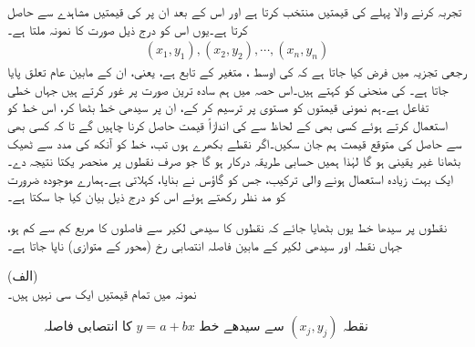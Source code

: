 تجربہ کرنے والا پہلے  کی  قیمتیں  منتخب کرتا ہے اور اس کے بعد ان  پر  کی قیمتیں مشاہدے سے حاصل کرتا ہے۔یوں اس کو درج ذیل صورت کا نمونہ ملتا ہے۔
\begin{align*}
(x_1,y_1), (x_2,y_2),\cdots,(x_n,y_n)
\end{align*} 
رجعی تجزیہ میں فرض کیا جاتا ہے کہ  کی اوسط ، متغیر  کے تابع ہے، یعنی، ان کے مابین عام تعلق  پایا جاتا ہے۔ کی منحنی کو  کہتے ہیں۔اس حصہ میں ہم سادہ ترین صورت پر غور کرتے ہیں جہاں  خطی تفاعل  ہے۔ہم نمونی قیمتوں کو  مستوی پر ترسیم کر کے، ان پر سیدھی خط بٹھا کر، اس خط کو استعمال کرتے ہوئے کسی بھی  کے لحاظ سے  کی اندازاً قیمت حاصل کرنا چاہیں گے تا کہ کسی بھی  سے حاصل  کی متوقع قیمت ہم جان سکیں۔اگر نقطے بکھرے ہوں تب، خط کو آنکھ کی مدد سے ٹھیک بٹھانا غیر یقینی ہو گا لہٰذا ہمیں حسابی طریقہ درکار ہو گا جو صرف نقطوں پر منحصر یکتا نتیجہ دے۔ایک بہت زیادہ استعمال ہونے والی ترکیب، جس کو گاؤس نے بنایا،   کہلاتی ہے۔ہمارے موجودہ ضرورت کو مد نظر رکھتے ہوئے اس کو درج ذیل بیان کیا جا سکتا ہے۔

نقطوں پر سیدھا خط یوں بٹھایا جائے کہ نقطوں کا سیدھی لکیر سے فاصلوں کا مربع کم سے کم ہو، جہاں نقطہ اور سیدھی لکیر کے مابین فاصلہ انتصابی رخ (محور  کے متوازی) ناپا جاتا ہے۔ 

 (الف)\\
نمونہ  میں تمام  قیمتیں  ایک سی نہیں ہیں۔

\begin{figure}
\centering
{}
\caption{نقطہ $(x_j,y_j)$ سے سیدھے خط $y=a+bx$ کا انتصابی فاصلہ}
\label{شکل_شماریات_خط_بٹھانا_انتصابی_فاصلہ}
\end{figure}

